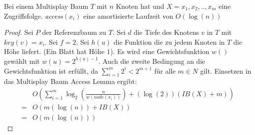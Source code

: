 \documentclass[a4paper,12pt]{article}
\begin{document}
\begin{Satz}Bei einem Multisplay Baum $T$ mit $n$ Knoten hat und $X = x_1, x_2,.., x_m$ eine Zugriffsfolge. \textit{access}$\left(x_i\right)$ eine amortisierte Laufzeit von $O\left(\log\left(n\right)\right)$ 
\end{Satz}
\begin{proof}
	
	Sei $P$ der Referenzbaum zu $T$. Sei $d$ die Tiefe des Knotens $v$ in $T$ mit $\mathit{key}\left(v\right) = x_i$. Sei $f = 2$. Sei $h\left(u\right)$ die Funktion die zu jedem Knoten in $T$ die Höhe liefert. (Ein Blatt hat Höhe $1$). Es wird eine Gewichtsfunktion $w\left(\right)$ gewählt mit  $w\left(u\right) = 2^{h\left(u\right)-1}$. Auch die zweite Bedingung an die Gewichtsfunktion ist erfüllt, da $\sum_{i = 1}^{m} 2^i < 2^{m+1}$ für alle $m \in \mathit{N}$ gilt. Einsetzen in das Multisplay Baum Access Lemma ergibt:
	\begin{align*}
	&O\left(  \sum_{i = 1}^{m} \log_2\left(   \frac{n}{w\left(\textit{node}\left(x_i\right)\right)}  \right)  
	+ \left(\log\left( 2\right)\right) \left(\mathit{IB}\left(X\right) + m\right) \right)\\
	=&O\left(m \left(\log\left(n\right) \right)+ \mathit{IB}\left(X\right) \right)\\
	=& O\left(m \left(\log\left(n\right)\right)\right)
	\end{align*}	
\end{proof}
\newpage


\end{document}
